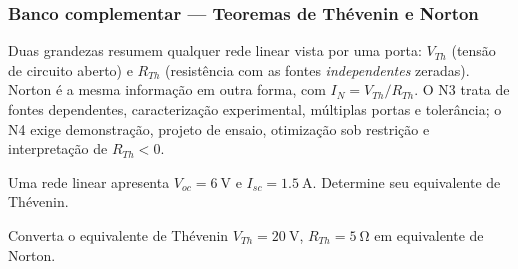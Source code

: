 
\subsubsection*{Banco complementar --- Teoremas de Thévenin e Norton}

\begin{atencao}
Duas grandezas resumem qualquer rede linear vista por uma porta:
$V_{Th}$ (tensão de circuito aberto) e $R_{Th}$ (resistência com as fontes
\emph{independentes} zeradas). Norton é a mesma informação em outra forma,
com $I_N=V_{Th}/R_{Th}$. O N3 trata de fontes dependentes, caracterização
experimental, múltiplas portas e tolerância; o N4 exige demonstração,
projeto de ensaio, otimização sob restrição e interpretação de
$R_{Th}<0$.
\end{atencao}

\blocofixacao

\begin{questao}[1]{}
Uma rede linear apresenta $V_{oc}=\SI{6}{\volt}$ e $I_{sc}=\SI{1.5}{\ampere}$.
Determine seu equivalente de Thévenin.
\end{questao}

\begin{questao}[1]{}
Converta o equivalente de Thévenin $V_{Th}=\SI{20}{\volt}$,
$R_{Th}=\SI{5}{\ohm}$ em equivalente de Norton.
\end{questao}

